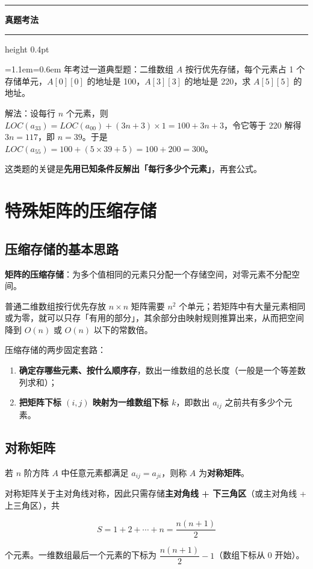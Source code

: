 \documentclass[11pt,openany,UTF8]{ctexbook}
\newcommand{\callouthead}[2]{%
  \par\addvspace{7pt}\noindent
  {\color{#1}\rule[-0.15em]{3pt}{1.05em}}\hspace{0.5em}%
  {\bfseries\color{#1}#2}\par\nobreak\vspace{-0.35em}%
  {\color{rulesep}\hrule height 0.4pt}\nobreak\vspace{0.45em}%
  \begingroup\small\setlength{\parindent}{0pt}%
  \leftskip=1.1em\rightskip=0.6em\noindent\ignorespaces}
\newcommand{\calloutend}{\par\endgroup\addvspace{7pt}}
\newenvironment{callexam}[1]{\callouthead{exambar}{#1}}{\calloutend}
\begin{document}
\begin{callexam}{真题考法}
2021 年考过一道典型题：二维数组 $A$ 按行优先存储，每个元素占 1 个存储单元，$A[0][0]$ 的地址是 100，$A[3][3]$ 的地址是 220，求 $A[5][5]$ 的地址。

解法：设每行 $n$ 个元素，则 $LOC(a_{33}) = LOC(a_{00}) + (3n+3) \times 1 = 100 + 3n + 3$，令它等于 220 解得 $3n = 117$，即 $n = 39$。于是 $LOC(a_{55}) = 100 + (5 \times 39 + 5) = 100 + 200 = 300$。

这类题的关键是\textbf{先用已知条件反解出「每行多少个元素」}，再套公式。

\end{callexam}

\section{特殊矩阵的压缩存储}

\subsection{压缩存储的基本思路}

\textbf{矩阵的压缩存储}：为多个值相同的元素只分配一个存储空间，对零元素不分配空间。

普通二维数组按行优先存放 $n \times n$ 矩阵需要 $n^2$ 个单元；若矩阵中有大量元素相同或为零，就可以只存「有用的部分」，其余部分由映射规则推算出来，从而把空间降到 $O(n)$ 或 $O(n)$ 以下的常数倍。

压缩存储的两步固定套路：

\begin{enumerate}
\item \textbf{确定存哪些元素、按什么顺序存}，数出一维数组的总长度（一般是一个等差数列求和）；
\item \textbf{把矩阵下标 $(i,j)$ 映射为一维数组下标 $k$}，即数出 $a_{ij}$ 之前共有多少个元素。
\end{enumerate}
\subsection{对称矩阵}

若 $n$ 阶方阵 $A$ 中任意元素都满足 $a_{ij} = a_{ji}$，则称 $A$ 为\textbf{对称矩阵}。

对称矩阵关于主对角线对称，因此只需存储\textbf{主对角线 + 下三角区}（或主对角线 + 上三角区），共

\[S = 1 + 2 + \cdots + n = \frac{n(n+1)}{2}\]

个元素。一维数组最后一个元素的下标为 $\dfrac{n(n+1)}{2} - 1$（数组下标从 0 开始）。
\end{document}
